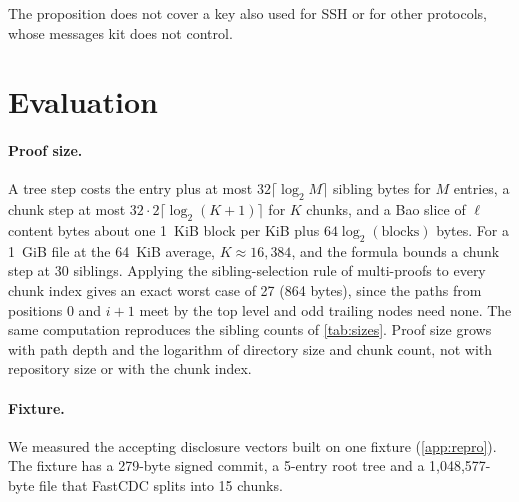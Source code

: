 \documentclass[10pt,letterpaper]{article}
\theoremstyle{remark}
\newcommand{\kit}{\textsf{kit}}
\begin{document}
The proposition does not cover a key also used for SSH or for other protocols,
whose messages \kit{} does not control.

\section{Evaluation}\label{sec:eval}

\paragraph{Proof size.}
A tree step costs the entry plus at most $32\lceil \log_2 M \rceil$ sibling
bytes for $M$ entries, a chunk step at most $32 \cdot 2\lceil \log_2 (K+1)
\rceil$ for $K$ chunks, and a Bao slice of $\ell$ content bytes about one
1~KiB block per KiB plus $64 \log_2(\text{blocks})$ bytes. For a 1~GiB file at
the 64~KiB average, $K \approx 16{,}384$, and the formula bounds a chunk step
at 30 siblings. Applying the sibling-selection rule of multi-proofs to
every chunk index gives an exact worst case of 27 (864 bytes), since the paths
from positions $0$ and $i+1$ meet by the top level and odd trailing nodes need
none. The same computation reproduces the sibling counts of \cref{tab:sizes}.
Proof size grows with path depth and the logarithm of directory size and chunk
count, not with repository size or with the chunk index.

\paragraph{Fixture.}
We measured the accepting disclosure vectors built on one fixture
(\cref{app:repro}). The fixture has a 279-byte signed commit, a 5-entry root
tree and a 1,048,577-byte file that FastCDC splits into 15 chunks.
\end{document}
